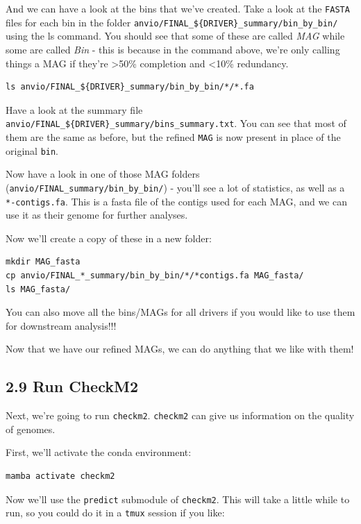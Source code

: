 \documentclass[
]{book}
\begin{document}
And we can have a look at the bins that we've created. Take a look at the \texttt{FASTA} files for each bin in the folder \texttt{anvio/FINAL\_\$\{DRIVER\}\_summary/bin\_by\_bin/} using the ls command. You should see that some of these are called \emph{MAG} while some are called \emph{Bin} - this is because in the command above, we're only calling things a MAG if they're \textgreater50\% completion and \textless10\% redundancy.

\begin{verbatim}
ls anvio/FINAL_${DRIVER}_summary/bin_by_bin/*/*.fa
\end{verbatim}

Have a look at the summary file \texttt{anvio/FINAL\_\$\{DRIVER\}\_summary/bins\_summary.txt}. You can see that most of them are the same as before, but the refined \texttt{MAG} is now present in place of the original \texttt{bin}.

Now have a look in one of those MAG folders (\texttt{anvio/FINAL\_summary/bin\_by\_bin/}) - you'll see a lot of statistics, as well as a \texttt{*-contigs.fa}. This is a fasta file of the contigs used for each MAG, and we can use it as their genome for further analyses.

Now we'll create a copy of these in a new folder:

\begin{verbatim}
mkdir MAG_fasta
cp anvio/FINAL_*_summary/bin_by_bin/*/*contigs.fa MAG_fasta/
ls MAG_fasta/
\end{verbatim}

You can also move all the bins/MAGs for all drivers if you would like to use them for downstream analysis!!!

Now that we have our refined MAGs, we can do anything that we like with them!

\subsection{2.9 Run CheckM2}\label{run-checkm2}

Next, we're going to run \texttt{checkm2}. \texttt{checkm2} can give us information on the quality of genomes.

First, we'll activate the conda environment:

\begin{verbatim}
mamba activate checkm2
\end{verbatim}

Now we'll use the \texttt{predict} submodule of \texttt{checkm2}. This will take a little while to run, so you could do it in a \texttt{tmux} session if you like:
\end{document}
